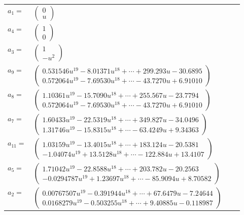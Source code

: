 \documentclass[1p]{elsarticle_modified}
\theoremstyle{definition}
\begin{document}
\begin{tabular}{m{7pt} m{180pt} m{7pt} m{180pt} }
\flushright $a_{1}=$&$\begin{pmatrix}0\\u\end{pmatrix}$ \\
\flushright $a_{4}=$&$\begin{pmatrix}1\\0\end{pmatrix}$ \\
\flushright $a_{3}=$&$\begin{pmatrix}1\\- u^2\end{pmatrix}$ \\
\flushright $a_{9}=$&$\begin{pmatrix}0.531546 u^{19}-8.01371 u^{18}+\cdots+299.293 u-30.6895\\0.572064 u^{19}-7.69530 u^{18}+\cdots-43.7270 u+6.91010\end{pmatrix}$ \\
\flushright $a_{8}=$&$\begin{pmatrix}1.10361 u^{19}-15.7090 u^{18}+\cdots+255.567 u-23.7794\\0.572064 u^{19}-7.69530 u^{18}+\cdots-43.7270 u+6.91010\end{pmatrix}$ \\
\flushright $a_{7}=$&$\begin{pmatrix}1.60433 u^{19}-22.5319 u^{18}+\cdots+349.827 u-34.0496\\1.31746 u^{19}-15.8315 u^{18}+\cdots-63.4249 u+9.34363\end{pmatrix}$ \\
\flushright $a_{11}=$&$\begin{pmatrix}1.03159 u^{19}-13.4015 u^{18}+\cdots+183.124 u-20.5381\\-1.04074 u^{19}+13.5128 u^{18}+\cdots-122.884 u+13.4107\end{pmatrix}$ \\
\flushright $a_{5}=$&$\begin{pmatrix}1.71042 u^{19}-22.8588 u^{18}+\cdots+203.782 u-20.2563\\-0.0294787 u^{19}+1.23697 u^{18}+\cdots-85.9094 u+8.70582\end{pmatrix}$ \\
\flushright $a_{2}=$&$\begin{pmatrix}0.00767507 u^{19}-0.391944 u^{18}+\cdots+67.6479 u-7.24644\\0.0168279 u^{19}-0.503255 u^{18}+\cdots+9.40885 u-0.118987\end{pmatrix}$ \\

\end{tabular}
\end{document}

